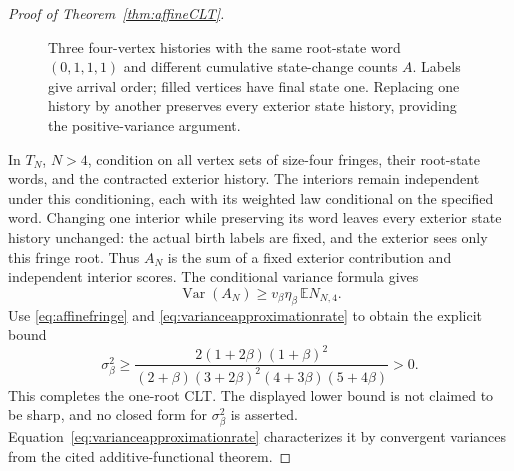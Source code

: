 \documentclass[runningheads,envcountsame,orivec]{llncs}
\newcommand{\E}{\mathbb E}
\begin{document}
\begin{proof}[Proof of Theorem~\ref{thm:affineCLT}]
\begin{figure}[t]
\centering
{}
\caption{Three four-vertex histories with the same root-state word
$(0,1,1,1)$ and different cumulative state-change counts $A$.
Labels give arrival order; filled vertices have final state one.
Replacing one history by another preserves every exterior state
history, providing the positive-variance argument.}
\label{fig:variancegadget}
\end{figure}

In $T_N$, $N>4$, condition on all vertex sets of size-four
fringes, their root-state words, and the contracted exterior history.
The interiors remain independent under this conditioning, each with
its weighted law conditional on the specified word. Changing one
interior while preserving its word leaves every exterior state
history unchanged: the actual birth labels are fixed, and the
exterior sees only this fringe root. Thus $A_N$ is the sum of a
fixed exterior contribution and independent interior scores.
The conditional variance formula gives
\[
 \operatorname{Var}(A_N)\ge
 v_\beta\eta_\beta\,\E N_{N,4}.
\]
Use \eqref{eq:affinefringe} and
\eqref{eq:varianceapproximationrate} to obtain the explicit bound
\begin{equation}\label{eq:positivePAvariance}
 \sigma_\beta^2\ge
 \frac{2(1+2\beta)(1+\beta)^2}
 {(2+\beta)(3+2\beta)^2(4+3\beta)(5+4\beta)}>0.
\end{equation}
This completes the one-root CLT. The displayed lower bound is not
claimed to be sharp, and no closed form for $\sigma_\beta^2$ is
asserted. Equation~\eqref{eq:varianceapproximationrate} characterizes
it by convergent variances from the cited additive-functional theorem.


\end{proof}
\end{document}
